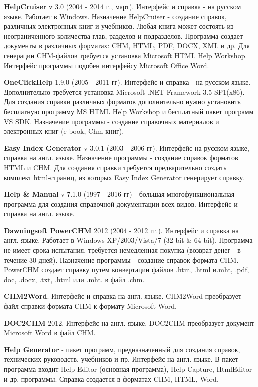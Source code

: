 		\textbf{HelpCruiser} v 3.0 (2004 - 2014 г., март). Интерфейс и справка - на русском языке. Работает в Windows.
		Назначение HelpCruiser - создание справок, различных электронных книг и учебников. Любая книга может состоять из неограниченного количества глав, разделов и подразделов. Программа создает документы в различных форматах: CHM, HTML, PDF, DOCX, XML и др. 
		Для генерации CHM-файлов требуется установка Microsoft HTML Help Workshop.
		Интерфейс программы подобен интерфейсу Microsoft Office Word. 
		
		\textbf{OneClickHelp } 1.9.0 (2005 - 2011 гг). Интерфейс и справка - на русском языке.
		Дополнительно требуется установка Microsoft .NET Framework 3.5 SP1(x86). Для создания справки различных форматов дополнительно нужно установить бесплатную программу MS HTML Help Workshop и бесплатный пакет программ VS SDK.
		Назначение программы - создание справочных материалов и электронных книг (e-book, Chm книг).
		
		\textbf{Easy Index Generator} v 3.0.1 (2003 - 2006 гг). Интерфейс на русском языке, справка на англ. языке.  
		Назначение программы - создание справок форматов HTML и CHM.
		Для создания справки требуется предварительно создать комплект html-страниц, из которых Easy Index Generator генерирует справку.
		
		\textbf{Help \& Manual}  v 7.1.0 (1997 - 2016 гг) - большая многофункциональная программа для создания справочной документации всех видов.  Интерфейс и справка на англ. языке. 
		
		
		\textbf{Dawningsoft PowerCHM} 2012 (2004 - 2012 гг.). Интерфейс и справка на англ. языке. 
		Работает в Windows XP/2003/Vista/7 (32-bit \& 64-bit).
		Программа не имеет срока испытания, требуется немедленная покупка (возврат денег - в течение 30 дней).
		Назначение программы - создание справок формата CHM.
		PowerCHM создает справку путем конвертации файлов .htm, .html и.mht, .pdf, doc, .docx, .txt, .html или .mht. в файл .chm.
		
		\textbf{CHM2Word}. Интерфейс и справка на англ. языке. 
		CHM2Word преобразует файл справки формата CHM к формату Microsoft Word.
		
		\textbf{DOC2CHM} 2012. Интерфейс на англ. языке.
		DOC2CHM преобразует документ Microsoft Word в файл CHM.
		
		\textbf{Help Generator} - пакет программ, предназначенный для создания справок, технических руководств, учебников и пр.
		Интерфейс на англ. языке.
		В пакет программа входит Help Editor (основная программа), Help Capture, HtmlEditor и др. программы.
		Справка создается в форматах CHM, HTML, Word.
		
